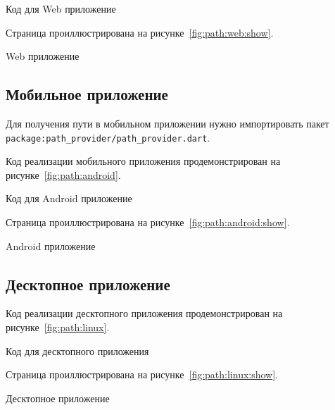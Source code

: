 \begin{image}
	\caption{Код для Web приложение}
	\label{fig:path:web}
\end{image}

Страница проиллюстрирована на рисунке~\ref{fig:path:web:show}.

\begin{image}
	\caption{Web приложение}
	\label{fig:path:web:show}
\end{image}

\subsection{Мобильное приложение}

Для получения пути в мобильном приложении нужно импортировать пакет
\verb|package:path_provider/path_provider.dart|.

Код реализации мобильного приложения продемонстрирован
на рисунке~\ref{fig:path:android}.

\begin{image}
	\caption{Код для Android приложение}
	\label{fig:path:android}
\end{image}

Страница проиллюстрирована на рисунке~\ref{fig:path:android:show}.

\begin{image}
	\caption{Android приложение}
	\label{fig:path:android:show}
\end{image}

\subsection{Десктопное приложение}

Код реализации десктопного приложения продемонстрирован
на рисунке~\ref{fig:path:linux}.

\begin{image}
	\caption{Код для десктопного приложения}
	\label{fig:path:linux}
\end{image}

Страница проиллюстрирована на рисунке~\ref{fig:path:linux:show}.

\begin{image}
	\caption{Десктопное приложение}
	\label{fig:path:linux:show}
\end{image}

